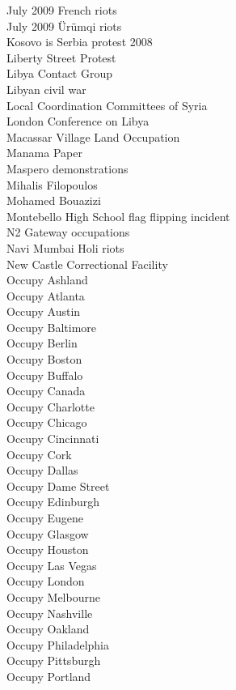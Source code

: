 July 2009 French riots\\
July 2009 Ürümqi riots\\
Kosovo is Serbia protest 2008\\
Liberty Street Protest\\
Libya Contact Group\\
Libyan civil war\\
Local Coordination Committees of Syria\\
London Conference on Libya\\
Macassar Village Land Occupation\\
Manama Paper\\
Maspero demonstrations\\
Mihalis Filopoulos\\
Mohamed Bouazizi\\
Montebello High School flag flipping incident\\
N2 Gateway occupations\\
Navi Mumbai Holi riots\\
New Castle Correctional Facility\\
Occupy Ashland\\
Occupy Atlanta\\
Occupy Austin\\
Occupy Baltimore\\
Occupy Berlin\\
Occupy Boston\\
Occupy Buffalo\\
Occupy Canada\\
Occupy Charlotte\\
Occupy Chicago\\
Occupy Cincinnati\\
Occupy Cork\\
Occupy Dallas\\
Occupy Dame Street\\
Occupy Edinburgh\\
Occupy Eugene\\
Occupy Glasgow\\
Occupy Houston\\
Occupy Las Vegas\\
Occupy London\\
Occupy Melbourne\\
Occupy Nashville\\
Occupy Oakland\\
Occupy Philadelphia\\
Occupy Pittsburgh\\
Occupy Portland\\

